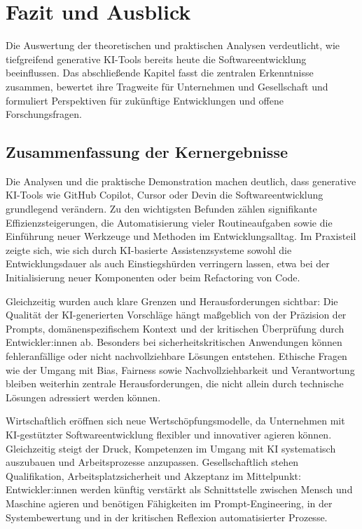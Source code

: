 \chapter{Fazit und Ausblick}
Die Auswertung der theoretischen und praktischen Analysen verdeutlicht, wie
tiefgreifend generative KI-Tools bereits heute die Softwareentwicklung
beeinflussen. Das abschließende Kapitel fasst die zentralen Erkenntnisse
zusammen, bewertet ihre Tragweite für Unternehmen und Gesellschaft und
formuliert Perspektiven für zukünftige Entwicklungen und offene
Forschungsfragen.

\section{Zusammenfassung der Kernergebnisse}
Die Analysen und die praktische Demonstration machen deutlich, dass generative
KI-Tools wie GitHub Copilot, Cursor oder Devin die Softwareentwicklung
grundlegend verändern. Zu den wichtigsten Befunden zählen signifikante
Effizienzsteigerungen, die Automatisierung vieler Routineaufgaben sowie die
Einführung neuer Werkzeuge und Methoden im Entwicklungsalltag. Im Praxisteil
zeigte sich, wie sich durch KI-basierte Assistenzsysteme sowohl die
Entwicklungsdauer als auch Einstiegshürden verringern lassen, etwa bei der
Initialisierung neuer Komponenten oder beim Refactoring von Code.

Gleichzeitig wurden auch klare Grenzen und Herausforderungen sichtbar: Die
Qualität der KI-generierten Vorschläge hängt maßgeblich von der Präzision der
Prompts, domänenspezifischem Kontext und der kritischen Überprüfung durch
Entwickler:innen ab. Besonders bei sicherheitskritischen Anwendungen können
fehleranfällige oder nicht nachvollziehbare Lösungen entstehen. Ethische Fragen
wie der Umgang mit Bias, Fairness sowie Nachvollziehbarkeit und Verantwortung
bleiben weiterhin zentrale Herausforderungen, die nicht allein durch technische
Lösungen adressiert werden können.

Wirtschaftlich eröffnen sich neue Wertschöpfungsmodelle, da Unternehmen mit
KI-gestützter Softwareentwicklung flexibler und innovativer agieren können.
Gleichzeitig steigt der Druck, Kompetenzen im Umgang mit KI systematisch
auszubauen und Arbeitsprozesse anzupassen. Gesellschaftlich stehen
Qualifikation, Arbeitsplatzsicherheit und Akzeptanz im Mittelpunkt:
Entwickler:innen werden künftig verstärkt als Schnittstelle zwischen Mensch und
Maschine agieren und benötigen Fähigkeiten im Prompt-Engineering, in der
Systembewertung und in der kritischen Reflexion automatisierter Prozesse.

